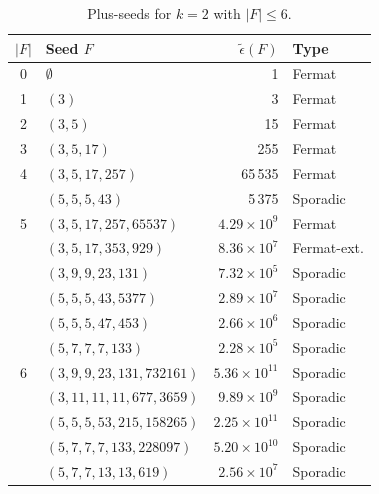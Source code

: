\documentclass[11pt]{article}
\theoremstyle{definition}
\theoremstyle{remark}
\newcommand{\eps}{\tilde{\epsilon}}
\begin{document}
\begin{table}[ht]
\centering
\caption{Plus-seeds for $k = 2$ with $|F| \le 6$.}\label{tab:seeds}
\smallskip
\begin{tabular}{@{}clrl@{}}
\toprule
$|F|$ & Seed $F$ & $\eps(F)$ & Type \\
\midrule
0 & $\emptyset$ & 1 & Fermat \\
1 & $(3)$ & 3 & Fermat \\
2 & $(3, 5)$ & 15 & Fermat \\
3 & $(3, 5, 17)$ & 255 & Fermat \\
4 & $(3, 5, 17, 257)$ & 65\,535 & Fermat \\
  & $(5, 5, 5, 43)$ & 5\,375 & Sporadic \\
5 & $(3, 5, 17, 257, 65537)$ & $4.29 \times 10^9$ & Fermat \\
  & $(3, 5, 17, 353, 929)$ & $8.36 \times 10^7$ & Fermat-ext. \\
  & $(3, 9, 9, 23, 131)$ & $7.32 \times 10^5$ & Sporadic \\
  & $(5, 5, 5, 43, 5377)$ & $2.89 \times 10^7$ & Sporadic \\
  & $(5, 5, 5, 47, 453)$ & $2.66 \times 10^6$ & Sporadic \\
  & $(5, 7, 7, 7, 133)$ & $2.28 \times 10^5$ & Sporadic \\
6 & $(3, 9, 9, 23, 131, 732161)$ & $5.36 \times 10^{11}$ & Sporadic \\
  & $(3, 11, 11, 11, 677, 3659)$ & $9.89 \times 10^{9}$ & Sporadic \\
  & $(5, 5, 5, 53, 215, 158265)$ & $2.25 \times 10^{11}$ & Sporadic \\
  & $(5, 7, 7, 7, 133, 228097)$ & $5.20 \times 10^{10}$ & Sporadic \\
  & $(5, 7, 7, 13, 13, 619)$ & $2.56 \times 10^{7}$ & Sporadic \\
\bottomrule
\end{tabular}
\end{table}
\end{document}
